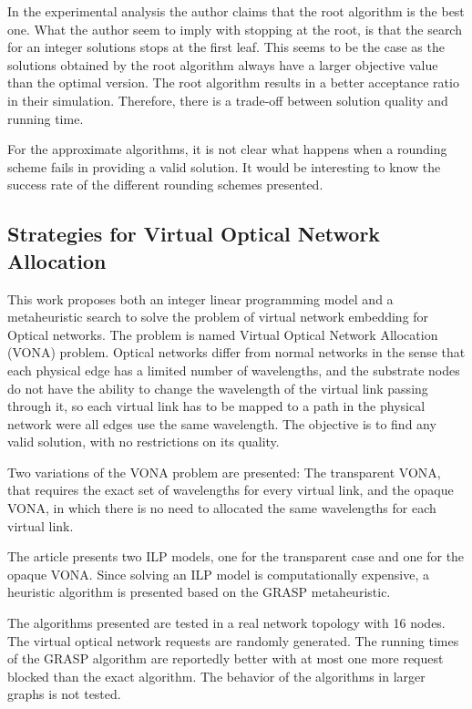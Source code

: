 In the experimental analysis the author claims that the root algorithm is the best one. What the author seem to imply with stopping at the root, is that the search for an integer solutions stops at the first leaf. This seems to be the case as the solutions obtained by the root algorithm always have a larger objective value than the optimal version. The root algorithm results in a better acceptance ratio in their simulation. Therefore, there is a trade-off between solution quality and running time.

For the approximate algorithms, it is not clear what happens when a rounding scheme fails in providing a valid solution. It would be interesting to know the success rate of the different rounding schemes presented.

\subsection{Strategies for Virtual Optical Network Allocation \cite{Pages:2012}}
This work proposes both an integer linear programming model and a metaheuristic search to solve the problem of virtual network embedding for Optical networks. The problem is named Virtual Optical Network Allocation (VONA) problem. Optical networks differ from normal networks in the sense that each physical edge has a limited number of wavelengths, and the substrate nodes do not have the ability to change the wavelength of the virtual link passing through it, so each virtual link has to be mapped to a path in the physical network were all edges use the same wavelength. The objective is to find any valid solution, with no restrictions on its quality.

Two variations of the VONA problem are presented: The transparent VONA, that requires the exact set of wavelengths for every virtual link, and the opaque VONA, in which there is no need to allocated the same wavelengths for each virtual link.

The article presents two ILP models, one for the transparent case and one for the opaque VONA\@. Since solving an ILP model is computationally expensive, a heuristic algorithm is presented based on the GRASP metaheuristic.

The algorithms presented are tested in a real network topology with 16 nodes. The virtual optical network requests are randomly generated. The running times of the GRASP algorithm are reportedly better with at most one more request blocked than the exact algorithm. The behavior of the algorithms in larger graphs is not tested.

